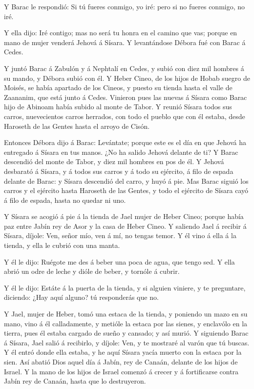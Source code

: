  Y Barac le respondió: Si tú fueres conmigo, yo iré: pero si
no fueres conmigo, no iré.

 Y ella dijo: Iré contigo; mas no será tu honra en el camino
que vas; porque en mano de mujer venderá Jehová á Sísara. Y levantándose
Débora fué con Barac á Cedes.

 Y juntó Barac á Zabulón y á Nephtalí en Cedes, y subió con
diez mil hombres á su mando, y Débora subió con él.  Y
Heber Cineo, de los hijos de Hobab suegro de Moisés, se había apartado
de los Cineos, y puesto su tienda hasta el valle de Zaananim, que está
junto á Cedes.  Vinieron pues las nuevas á Sísara como
Barac hijo de Abinoam había subido al monte de Tabor.  Y
reunió Sísara todos sus carros, nuevecientos carros herrados, con todo
el pueblo que con él estaba, desde Haroseth de las Gentes hasta el
arroyo de Cisón.

 Entonces Débora dijo á Barac: Levántate; porque este es el
día en que Jehová ha entregado á Sísara en tus manos. ¿No ha salido
Jehová delante de ti? Y Barac descendió del monte de Tabor, y diez mil
hombres en pos de él.  Y Jehová desbarató á Sísara, y á
todos sus carros y á todo su ejército, á filo de espada delante de
Barac: y Sísara descendió del carro, y huyó á pie.  Mas
Barac siguió los carros y el ejército hasta Haroseth de las Gentes, y
todo el ejército de Sísara cayó á filo de espada, hasta no quedar ni
uno.

 Y Sísara se acogió á pie á la tienda de Jael mujer de
Heber Cineo; porque había paz entre Jabín rey de Asor y la casa de Heber
Cineo.  Y saliendo Jael á recibir á Sísara, díjole: Ven,
señor mío, ven á mí, no tengas temor. Y él vino á ella á la tienda, y
ella le cubrió con una manta.

 Y él le dijo: Ruégote me des á beber una poca de agua, que
tengo sed. Y ella abrió un odre de leche y dióle de beber, y tornóle á
cubrir.

 Y él le dijo: Estáte á la puerta de la tienda, y si
alguien viniere, y te preguntare, diciendo: ¿Hay aquí alguno? tú
responderás que no.

 Y Jael, mujer de Heber, tomó una estaca de la tienda, y
poniendo un mazo en su mano, vino á él calladamente, y metióle la estaca
por las sienes, y enclavólo en la tierra, pues él estaba cargado de
sueño y cansado; y así murió.  Y siguiendo Barac á Sísara,
Jael salió á recibirlo, y díjole: Ven, y te mostraré al varón que tú
buscas. Y él entró donde ella estaba, y he aquí Sísara yacía muerto con
la estaca por la sien.  Así abatió Dios aquel día á Jabín,
rey de Canaán, delante de los hijos de Israel.  Y la mano
de los hijos de Israel comenzó á crecer y á fortificarse contra Jabín
rey de Canaán, hasta que lo destruyeron.

